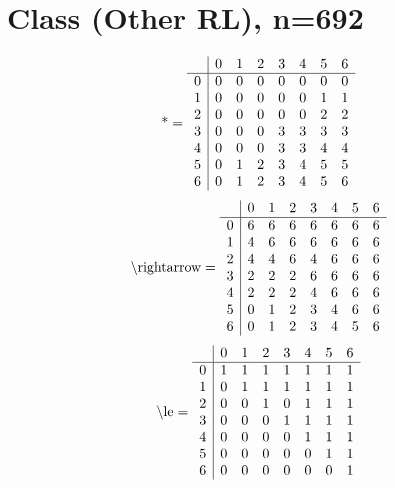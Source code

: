 \documentclass[11pt]{article}
\begin{document}
\section{Class (Other RL), n=692}
\[\text{*} = 
\begin{array}{r | r r r r r r r}
 & 0 & 1 & 2 & 3 & 4 & 5 & 6 \\ \hline
0 & 0 & 0 & 0 & 0 & 0 & 0 & 0 \\
1 & 0 & 0 & 0 & 0 & 0 & 1 & 1 \\
2 & 0 & 0 & 0 & 0 & 0 & 2 & 2 \\
3 & 0 & 0 & 0 & 3 & 3 & 3 & 3 \\
4 & 0 & 0 & 0 & 3 & 3 & 4 & 4 \\
5 & 0 & 1 & 2 & 3 & 4 & 5 & 5 \\
6 & 0 & 1 & 2 & 3 & 4 & 5 & 6 \\
\end{array}
\]
\[\text{\textbackslash rightarrow} = 
\begin{array}{r | r r r r r r r}
 & 0 & 1 & 2 & 3 & 4 & 5 & 6 \\ \hline
0 & 6 & 6 & 6 & 6 & 6 & 6 & 6 \\
1 & 4 & 6 & 6 & 6 & 6 & 6 & 6 \\
2 & 4 & 4 & 6 & 4 & 6 & 6 & 6 \\
3 & 2 & 2 & 2 & 6 & 6 & 6 & 6 \\
4 & 2 & 2 & 2 & 4 & 6 & 6 & 6 \\
5 & 0 & 1 & 2 & 3 & 4 & 6 & 6 \\
6 & 0 & 1 & 2 & 3 & 4 & 5 & 6 \\
\end{array}
\]
\[\text{\textbackslash le} = 
\begin{array}{r | r r r r r r r}
 & 0 & 1 & 2 & 3 & 4 & 5 & 6 \\ \hline
0 & 1 & 1 & 1 & 1 & 1 & 1 & 1 \\
1 & 0 & 1 & 1 & 1 & 1 & 1 & 1 \\
2 & 0 & 0 & 1 & 0 & 1 & 1 & 1 \\
3 & 0 & 0 & 0 & 1 & 1 & 1 & 1 \\
4 & 0 & 0 & 0 & 0 & 1 & 1 & 1 \\
5 & 0 & 0 & 0 & 0 & 0 & 1 & 1 \\
6 & 0 & 0 & 0 & 0 & 0 & 0 & 1 \\
\end{array}
\]
\end{document}
